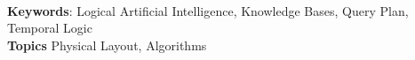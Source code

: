 \documentclass[11pt]{article}
\begin{document}
\begin{abstract}
%
%
%
%
%
%
%
%
%	
\end{abstract}
~\\

{\bf Keywords}: Logical Artificial Intelligence, Knowledge Bases, Query Plan, Temporal Logic
~\\

{\bf Topics} Physical Layout, Algorithms
~\\
\end{document}
